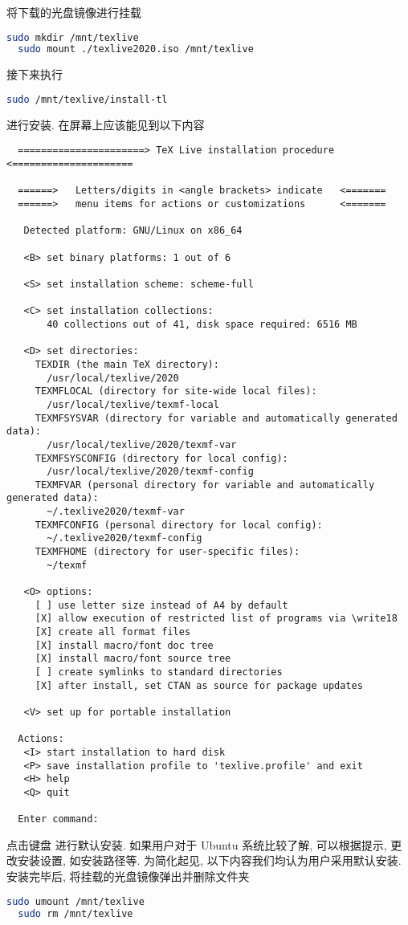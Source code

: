 将下载的光盘镜像进行挂载
\begin{lstlisting}[language = bash]
  sudo mkdir /mnt/texlive
  sudo mount ./texlive2020.iso /mnt/texlive
\end{lstlisting}
接下来执行
\begin{lstlisting}[language = bash]
  sudo /mnt/texlive/install-tl
\end{lstlisting}
进行安装.
在屏幕上应该能见到以下内容
\begin{lstlisting}
  ======================> TeX Live installation procedure <=====================
  
  ======>   Letters/digits in <angle brackets> indicate   <=======
  ======>   menu items for actions or customizations      <=======
  
   Detected platform: GNU/Linux on x86_64
   
   <B> set binary platforms: 1 out of 6
  
   <S> set installation scheme: scheme-full
  
   <C> set installation collections:
       40 collections out of 41, disk space required: 6516 MB
  
   <D> set directories:
     TEXDIR (the main TeX directory):
       /usr/local/texlive/2020
     TEXMFLOCAL (directory for site-wide local files):
       /usr/local/texlive/texmf-local
     TEXMFSYSVAR (directory for variable and automatically generated data):
       /usr/local/texlive/2020/texmf-var
     TEXMFSYSCONFIG (directory for local config):
       /usr/local/texlive/2020/texmf-config
     TEXMFVAR (personal directory for variable and automatically generated data):
       ~/.texlive2020/texmf-var
     TEXMFCONFIG (personal directory for local config):
       ~/.texlive2020/texmf-config
     TEXMFHOME (directory for user-specific files):
       ~/texmf
  
   <O> options:
     [ ] use letter size instead of A4 by default
     [X] allow execution of restricted list of programs via \write18
     [X] create all format files
     [X] install macro/font doc tree
     [X] install macro/font source tree
     [ ] create symlinks to standard directories
     [X] after install, set CTAN as source for package updates
  
   <V> set up for portable installation
  
  Actions:
   <I> start installation to hard disk
   <P> save installation profile to 'texlive.profile' and exit
   <H> help
   <Q> quit
  
  Enter command: 
\end{lstlisting}
点击键盘  进行默认安装.
如果用户对于 Ubuntu 系统比较了解,
可以根据提示,
更改安装设置,
如安装路径等.
为简化起见,
以下内容我们均认为用户采用默认安装.
安装完毕后, 将挂载的光盘镜像弹出并删除文件夹
\begin{lstlisting}[language = bash]
  sudo umount /mnt/texlive
  sudo rm /mnt/texlive
\end{lstlisting}

